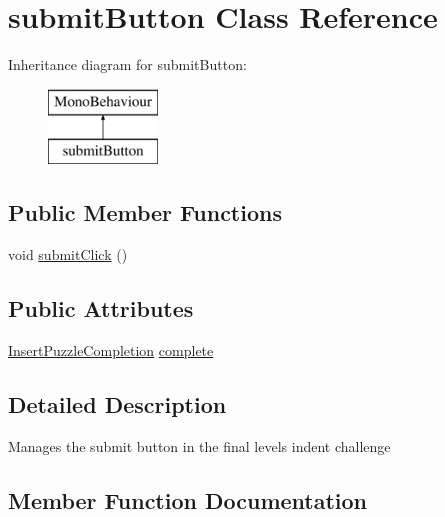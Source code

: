 \hypertarget{classsubmit_button}{}\section{submit\+Button Class Reference}
\label{classsubmit_button}
Inheritance diagram for submit\+Button\+:\begin{figure}[H]
\begin{center}
\leavevmode
\includegraphics[height=2.000000cm]{classsubmit_button}
\end{center}
\end{figure}
\subsection*{Public Member Functions}
\begin{DoxyCompactItemize}
\item 
void \hyperlink{classsubmit_button_a682e0af5e758d552d985e64a1003f7cd}{submit\+Click} ()
\end{DoxyCompactItemize}
\subsection*{Public Attributes}
\begin{DoxyCompactItemize}
\item 
\hyperlink{class_insert_puzzle_completion}{Insert\+Puzzle\+Completion} \hyperlink{classsubmit_button_a1346ad28f62e29199c2f2fb7859d47cb}{complete}
\end{DoxyCompactItemize}


\subsection{Detailed Description}
Manages the submit button in the final level\textquotesingle{}s indent challenge 

\subsection{Member Function Documentation}
\mbox{\label{classsubmit_button_a682e0af5e758d552d985e64a1003f7cd}} 
